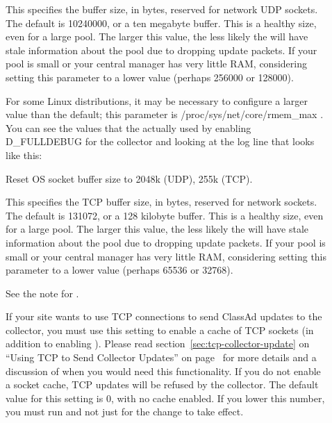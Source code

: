 \begin{description}
\item[] 
  \label{param:CollectorSocketBufsize} This specifies the buffer size, in
  bytes, reserved for  network UDP sockets.  The default is
  10240000, or a ten megabyte buffer.  This is a healthy size, even for a large
  pool.  The larger this value, the less likely the  will
  have stale information about the pool due to dropping update packets.  If
  your pool is small or your central manager has very little RAM, considering
  setting this parameter to a lower value (perhaps 256000 or 128000).

\Note For some Linux distributions, it may be necessary to configure
a larger value than the default; this parameter is
/proc/sys/net/core/rmem\_max .  You can see the values that the
 actually used by enabling D\_FULLDEBUG for the
collector and looking at the log line that looks like this:

Reset OS socket buffer size to 2048k (UDP), 255k (TCP).

\item[]

  \label{param:CollectorTcpSocketBufsize} This specifies the TCP buffer
  size, in  bytes, reserved for  network sockets.  The
  default is 131072, or a 128 kilobyte buffer.  This is a healthy size, even
  for a large pool.  The larger this value, the less likely the
   will have stale information about the pool due to
  dropping update packets.  If your pool is small or your central
  manager has very little RAM, considering setting this parameter to a
  lower value (perhaps 65536 or 32768).

\Note See the note for .

\item[] 
  \label{param:CollectorSocketCacheSize} 
  If your site wants to use TCP connections to send ClassAd updates to
  the collector, you must use this setting to enable a cache of TCP
  sockets (in addition to enabling
  ). 
  Please read section~\ref{sec:tcp-collector-update} on ``Using TCP to
  Send Collector Updates'' on page~\pageref{sec:tcp-collector-update}
  for more details and a discussion of when you would need this
  functionality. 
  If you do not enable a socket cache, TCP updates will be refused by
  the collector.
  The default value for this setting is 0, with no cache enabled.   
  If you lower this number, you must run  and not just
   for the change to take effect.


\end{description}
